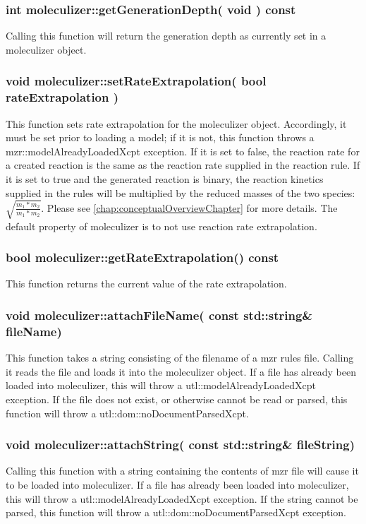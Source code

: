 \subsubsection{int moleculizer::getGenerationDepth( void ) const}
Calling this function will return the generation depth as currently
set in a moleculizer object.  

\subsubsection{void moleculizer::setRateExtrapolation( bool
  rateExtrapolation )}
This function sets rate extrapolation for the moleculizer object.
Accordingly, it must be set prior to loading a model; if it is not,
this function throws a mzr::modelAlreadyLoadedXcpt exception.  If
it is set to false, the reaction rate for a created reaction is the
same as the reaction rate supplied in the reaction rule.  If it is set
to true and the generated reaction is binary, the reaction kinetics
supplied in the rules will be multiplied by the reduced masses of the
two species: $\sqrt{ \frac{ m_1 * m_2}{m_1 * m_2}}$.  Please see
\ref{chap:conceptualOverviewChapter} for more details.  The default
property of moleculizer is to not use reaction rate extrapolation.


\subsubsection{bool moleculizer::getRateExtrapolation() const}
This function returns the current value of the rate extrapolation.

\subsubsection{void moleculizer::attachFileName( const std::string\&
  fileName)}

This function takes a string consisting of the filename of a mzr rules
file.  Calling it reads the file and loads it into the moleculizer
object.  If a file has already been loaded into moleculizer, this will
throw a utl::modelAlreadyLoadedXcpt exception.  If the file does not
exist, or otherwise cannot be read or parsed, this function will throw
a utl::dom::noDocumentParsedXcpt.

\subsubsection{void moleculizer::attachString( const std::string\&
  fileString)}
Calling this function with a string containing the contents of mzr
file will cause it to be loaded into moleculizer.  If a file has
already been loaded into moleculizer, this will throw a
utl::modelAlreadyLoadedXcpt exception.  If the string cannot be
parsed, this function will throw a utl::dom::noDocumentParsedXcpt
exception.

